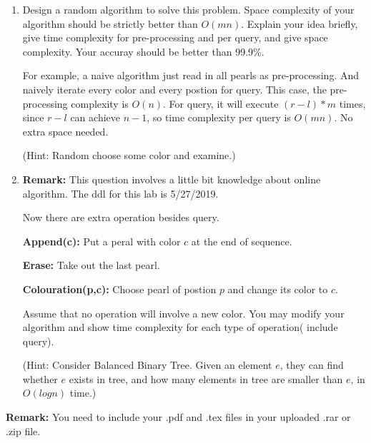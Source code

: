 \documentclass[12pt,a4paper]{article}
\theoremstyle{definition}
\begin{document}
\begin{enumerate}
\begin{enumerate}
\item Design a random algorithm to solve this problem. Space complexity of your algorithm should be strictly better than $O(mn)$. Explain your idea briefly, give time complexity for pre-processing and per query, and give space complexity. Your accuray should be better than 99.9\%. \par
For example, a naive algorithm just read in all pearls as pre-processing. And naively iterate every color and every postion for query. This case, the pre-processing complexity is $O(n)$. For query, it will execute $(r-l)*m$ times, since $r-l$ can achieve $n-1$, so time complexity per query is $O(mn)$. No extra space needed.\par
\color{blue}(Hint: Random choose some color and examine.)\color{black}
\item \textbf{Remark:} This question involves a little bit knowledge about online algorithm. The ddl for this lab is 5/27/2019. \par
Now there are extra operation besides query.\par
\textbf{Append(c):} Put a peral with color $c$ at the end of sequence.\par
\textbf{Erase:} Take out the last pearl.\par
\textbf{Colouration(p,c):} Choose pearl of postion $p$ and change its color to $c$.\par
Assume that no operation will involve a new color. You may modify your algorithm and show time complexity for each type of operation( include query).\par  
\color{blue}(Hint: Consider Balanced Binary Tree. Given an element $e$, they can find whether $e$ exists in tree, and how many elements in tree are smaller than $e$, in $O(logn)$ time.)\color{black}
\end{enumerate} 



    

\end{enumerate}

\vspace{20pt}

\textbf{Remark:} You need to include your .pdf and .tex files in your uploaded .rar or .zip file.

\end{document}
